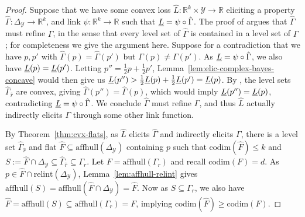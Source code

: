 \documentclass{article}
\newcommand{\reals}{\mathbb{R}}
\newcommand{\simplex}{\Delta_\Y}
\newcommand{\relint}[1]{\mathrm{relint}(#1)}
\newcommand{\codim}{\mathrm{codim}}
\newcommand{\affhull}{\mathrm{affhull}}
\newcommand{\Y}{\mathcal{Y}}
\begin{document}
\begin{proof}
  Suppose that we have some convex loss $\hat L:\reals^k\times\Y\to\reals$ eliciting a property $\hat\Gamma:\simplex\to\reals^k$, and link $\psi : \reals^k \to \reals$ such that $\underline{L} = \psi \circ \hat\Gamma$.
  The proof of \citet[Theorem 4]{frongillo2018elicitation} argues that $\hat\Gamma$ must refine $\Gamma$, in the sense that every level set of $\hat\Gamma$ is contained in a level set of $\Gamma$; for completeness we give the argument here.
  Suppose for a contradiction that we have $p,p'$ with $\hat\Gamma(p)=\hat\Gamma(p')$ but $\Gamma(p) \neq \Gamma(p')$.
  As $\underline{L} = \psi \circ \hat\Gamma$, we also have $\underline{L}(p) = \underline{L}(p')$.
  Letting $p'' = \tfrac 1 2 p +  \tfrac 1 2 p'$, Lemma~\ref{lem:elic-complex-bayes-concave} would then give us $\underline{L}(p'') >  \tfrac 1 2 \underline{L}(p) +  \tfrac 1 2 \underline{L}(p') = \underline{L}(p)$.
  By \citet{osband1985providing}, the level sets $\hat\Gamma_{\hat r}$ are convex, giving $\hat\Gamma(p'') = \hat\Gamma(p)$, which would imply $\underline{L}(p'')=\underline{L}(p)$, contradicting $\underline{L} = \psi \circ \hat\Gamma$.
  We conclude $\hat\Gamma$ must refine $\Gamma$, and thus $\hat L$ actually indirectly elicits $\Gamma$ through some other link function.

  By Theorem~\ref{thm:cvx-flats}, as $\hat L$ elicits $\hat\Gamma$ and indirectly elicits $\Gamma$, there is a level set $\hat\Gamma_{\hat r}$ and flat $\hat F\subseteq\affhull(\simplex)$ containing $p$ such that $\codim(\hat F) \leq k$ and $S := \hat F \cap \simplex \subseteq \hat\Gamma_{\hat r} \subseteq \Gamma_r$.
  Let $F = \affhull(\Gamma_r)$ and recall $\codim(F)=d$.
  As $p\in \hat F\cap\relint\simplex$, Lemma~\ref{lem:affhull-relint} gives $\affhull(S) = \affhull(\hat F\cap \simplex) = \hat F$.
  Now as $S \subseteq \Gamma_r$, we also have $\hat F = \affhull(S) \subseteq \affhull(\Gamma_r) = F$,
  implying $\codim(\hat F) \geq \codim(F)$.


\end{proof}
\end{document}
